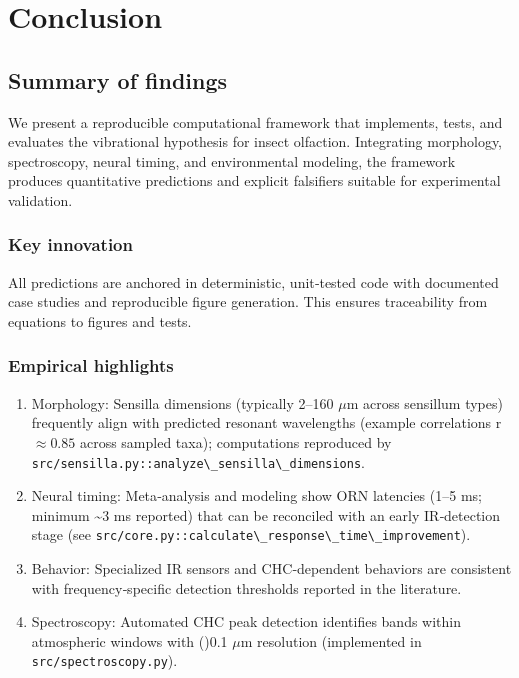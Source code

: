 \documentclass[
  13pt,
  a4paperpaper,
  12pt]{article}
\author{}
\date{}
\newcommand{\passthrough}[1]{#1}
\providecommand{\tightlist}{%
  \setlength{\itemsep}{0pt}\setlength{\parskip}{0pt}}
\let\oldsection\section
\renewcommand{\section}{\clearpage\oldsection}
\begin{document}
{
\hypersetup{linkcolor=black}
\setcounter{tocdepth}{3}
\tableofcontents
}
\section{Conclusion}\label{sec:conclusion}

\subsection{Summary of findings}\label{summary-of-findings}

We present a reproducible computational framework that implements,
tests, and evaluates the vibrational hypothesis for insect olfaction.
Integrating morphology, spectroscopy, neural timing, and environmental
modeling, the framework produces quantitative predictions and explicit
falsifiers suitable for experimental validation.

\subsubsection{Key innovation}\label{key-innovation}

All predictions are anchored in deterministic, unit‑tested code with
documented case studies and reproducible figure generation. This ensures
traceability from equations to figures and tests.

\subsubsection{Empirical highlights}\label{empirical-highlights}

\begin{enumerate}
\def\labelenumi{\arabic{enumi}.}
\tightlist
\item
  Morphology: Sensilla dimensions (typically 2--160 \(\mu\mathrm{m}\)
  across sensillum types) frequently align with predicted resonant
  wavelengths (example correlations r \(\approx 0.85\) across sampled
  taxa); computations reproduced by
  \passthrough{\lstinline!src/sensilla.py::analyze\_sensilla\_dimensions!}.
\item
  Neural timing: Meta‑analysis and modeling show ORN latencies (1--5 ms;
  minimum \textasciitilde3 ms reported) that can be reconciled with an
  early IR‑detection stage (see
  \passthrough{\lstinline!src/core.py::calculate\_response\_time\_improvement!}).
\item
  Behavior: Specialized IR sensors and CHC‑dependent behaviors are
  consistent with frequency‑specific detection thresholds reported in
  the literature.
\item
  Spectroscopy: Automated CHC peak detection identifies bands within
  atmospheric windows with (\pm)0.1 \(\mu\mathrm{m}\) resolution
  (implemented in \passthrough{\lstinline!src/spectroscopy.py!}).
\end{enumerate}
\end{document}

